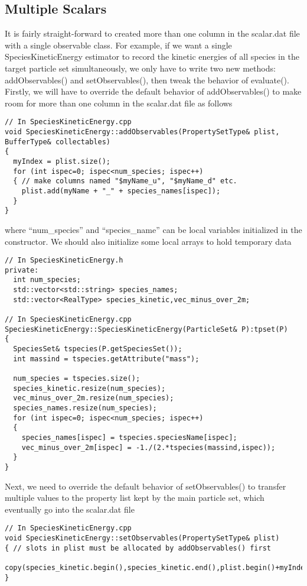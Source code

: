 \documentclass[aps,prl,preprint]{revtex4-1}
\begin{document}
\subsection{Multiple Scalars}
It is fairly straight-forward to created more than one column in the scalar.dat file with a single observable class. For example, if we want a single SpeciesKineticEnergy estimator to record the kinetic energies of all species in the target particle set simultaneously, we only have to write two new methods: addObservables() and setObservables(), then tweak the behavior of evaluate(). Firstly, we will have to override the default behavior of addObservables() to make room for more than one column in the scalar.dat file as follows
\begin{lstlisting}
// In SpeciesKineticEnergy.cpp
void SpeciesKineticEnergy::addObservables(PropertySetType& plist, BufferType& collectables)
{
  myIndex = plist.size();
  for (int ispec=0; ispec<num_species; ispec++)
  { // make columns named "$myName_u", "$myName_d" etc.
    plist.add(myName + "_" + species_names[ispec]);
  }
}
\end{lstlisting}
where ``num\_species'' and ``species\_name'' can be local variables initialized in the constructor. We should also initialize some local arrays to hold temporary data
\begin{lstlisting}
// In SpeciesKineticEnergy.h
private:
  int num_species;
  std::vector<std::string> species_names;
  std::vector<RealType> species_kinetic,vec_minus_over_2m;
  
// In SpeciesKineticEnergy.cpp
SpeciesKineticEnergy::SpeciesKineticEnergy(ParticleSet& P):tpset(P)
{
  SpeciesSet& tspecies(P.getSpeciesSet());
  int massind = tspecies.getAttribute("mass");

  num_species = tspecies.size();
  species_kinetic.resize(num_species);
  vec_minus_over_2m.resize(num_species);
  species_names.resize(num_species);
  for (int ispec=0; ispec<num_species; ispec++)
  {
    species_names[ispec] = tspecies.speciesName[ispec];
    vec_minus_over_2m[ispec] = -1./(2.*tspecies(massind,ispec));   
  }
}
\end{lstlisting}
Next, we need to override the default behavior of setObservables() to transfer multiple values to the property list kept by the main particle set, which eventually go into the scalar.dat file
\begin{lstlisting}
// In SpeciesKineticEnergy.cpp
void SpeciesKineticEnergy::setObservables(PropertySetType& plist)
{ // slots in plist must be allocated by addObservables() first
  copy(species_kinetic.begin(),species_kinetic.end(),plist.begin()+myIndex);
}
\end{lstlisting}
\end{document}
